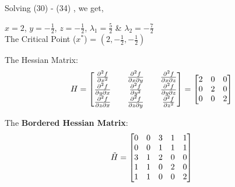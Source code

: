 \documentclass[12pt, letterpaper]{article}
\begin{document}
Solving (30) - (34) , we get,

$x=2$, $y=-\frac{1}{2}$, $z=-\frac{1}{2}$, $\lambda_1 = \frac{5}{2}$ & $\lambda_2=-\frac{7}{2}$\\


\therefore The\hspace{0.1cm} Critical\hspace{0.1cm} Point ($x^*$) = $(2,-\frac{1}{2},-\frac{1}{2})$


The Hessian Matrix: 
\begin{equation}
    H = \begin{bmatrix}
    \pdv[2]{f}{x} && \pdv{f}{x}{y} && \pdv{f}{x}{z} \\
    \pdv{f}{y}{x} && \pdv[2]{f}{y} && \pdv{f}{y}{z} \\
    \pdv{f}{z}{x} && \pdv{f}{z}{y} && \pdv[2]{f}{z} 
    \end{bmatrix} = \begin{bmatrix}
    2 & 0 & 0 \\ 0 & 2 & 0 \\ 0 & 0 & 2
    \end{bmatrix}
\end{equation}

The \textbf{Bordered Hessian Matrix}:
\begin{equation}
    \Tilde{H} = 
    \begin{bmatrix}
    0 & 0 & 3 & 1 & 1 \\ 0 & 0 & 1 & 1 & 1 \\ 3 & 1 & 2 & 0 & 0 \\ 1 & 1 & 0 & 2 & 0 \\ 1 & 1 & 0 & 0 & 2
    \end{bmatrix}
\end{equation}
\end{document}

